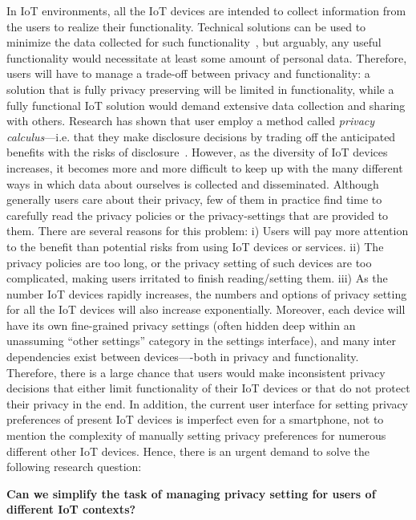 In IoT environments, all the IoT devices are intended to collect information from the users to realize their functionality. Technical solutions can be used to minimize the data collected for such functionality~\cite{kobsa2006privacy,pfitzmann2001anonymity,verykios2004state}, but arguably, any useful functionality would necessitate at least some amount of personal data. Therefore, users will have to manage a trade-off between privacy and functionality: a solution that is fully privacy preserving will be limited in functionality, while a fully functional IoT solution would demand extensive data collection and sharing with others. Research has shown that user employ a method called \textit{privacy calculus}---i.e. that they make disclosure decisions by trading off the anticipated benefits with the risks of disclosure~\cite{culnan1993did,laufer1977privacy,taylor2009privacy}. However, as the diversity of IoT devices increases, it becomes more and more difficult to keep up with the many different ways in which data about ourselves is collected and disseminated. Although generally users care about their privacy, few of them in practice find time to carefully read the privacy policies or the privacy-settings that are provided to them. There are several reasons for this problem: i) Users will pay more attention to the benefit than potential risks from using IoT devices or services. ii) The privacy policies are too long, or the privacy setting of such devices are too complicated, making users irritated to finish reading/setting them. iii) As the number IoT devices rapidly increases, the numbers and options of privacy setting for all the IoT devices will also increase exponentially. Moreover, each device will have its own fine-grained privacy settings (often hidden deep within an unassuming “other settings” category in the settings interface), and many inter dependencies exist between devices—-both in privacy and functionality. Therefore, there is a large chance that users would make inconsistent privacy decisions that either limit functionality of their IoT devices or that do not protect their privacy in the end. In addition, the current user interface for setting privacy preferences of present IoT devices is imperfect even for a smartphone, not to mention the complexity of manually setting privacy preferences for numerous different other IoT devices. Hence, there is an urgent demand to solve the following research question:

\textbf{Can we simplify the task of managing privacy setting for users of different IoT contexts?}

